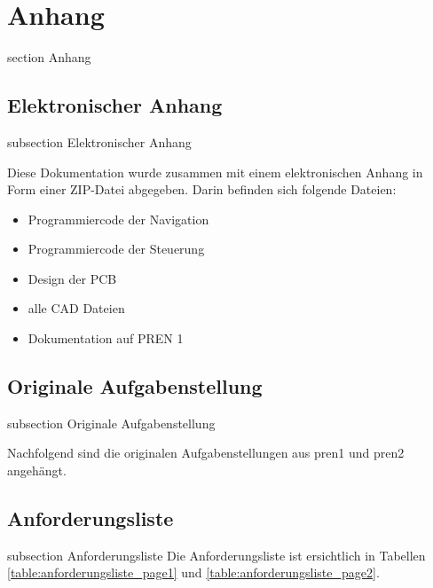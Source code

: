 \newpage

\section*{Anhang}
    {section}
    {Anhang}



\subsection*{Elektronischer Anhang}\label{elect-anhang}
{subsection}
{Elektronischer Anhang}

Diese Dokumentation wurde zusammen mit einem elektronischen Anhang in Form einer ZIP-Datei abgegeben. Darin befinden sich folgende Dateien:

\begin{itemize}
    \item Programmiercode der Navigation
    \item Programmiercode der Steuerung
    \item Design der PCB
    \item alle CAD Dateien
    \item Dokumentation auf PREN 1
\end{itemize}


\newpage

\newpage


\subsection*{Originale Aufgabenstellung}\label{aufgabenstellung}
{subsection}
{Originale Aufgabenstellung}

Nachfolgend sind die originalen Aufgabenstellungen aus \acrshort{pren1} und \acrshort{pren2} angehängt.






\subsection*{Anforderungsliste}\label{anforderungliste}
    {subsection}
    {Anforderungsliste}
Die  Anforderungsliste ist ersichtlich in Tabellen \ref{table:anforderungsliste_page1} und \ref{table:anforderungsliste_page2}.

